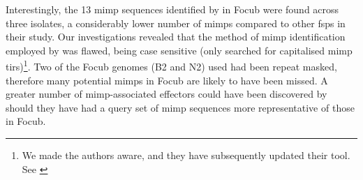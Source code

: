 Interestingly, the 13 mimp sequences identified by \textcite{Dam2016} in \ac{Focub} were found across three isolates, a considerably lower number of \acp{mimp} compared to other \acp{fsp} in their study. Our investigations revealed that the method of \ac{mimp} identification employed by \textcite{Dam2016} was flawed, being case sensitive (only searched for capitalised \ac{mimp} \acp{tir})\footnote{We made the authors aware, and they have subsequently updated their tool. See \textcite{FoEC2} }. Two of the \ac{Focub} genomes (B2 and N2) used had been repeat masked, therefore many potential \acp{mimp} in \ac{Focub} are likely to have been missed. A greater number of \ac{mimp}-associated effectors could have been discovered by \textcite{Chang2020} should they have had a query set of \ac{mimp} sequences more representative of those in \ac{Focub}.

 


